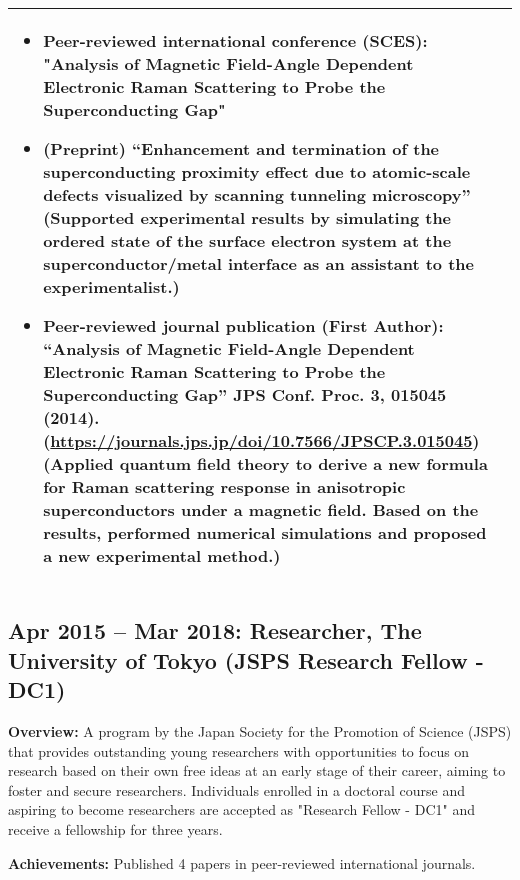 \documentclass[uplatex,a4j,10.5pt,dvipdfmx]{jsarticle}
\newcommand{\textbfsubsection}[1]{\subsection*{\textbf{#1}}}
\begin{document}
\begin{longtable}{|l|p{14cm}|}
\begin{itemize}[leftmargin=*]
		                                        \item Peer-reviewed international conference (SCES): "Analysis of Magnetic Field-Angle Dependent Electronic Raman Scattering to Probe the Superconducting Gap"
		                                        \item (Preprint) “Enhancement and termination of the superconducting proximity effect due to atomic-scale defects visualized by scanning tunneling microscopy” (Supported experimental results by simulating the ordered state of the surface electron system at the superconductor/metal interface as an assistant to the experimentalist.)
		                                        \item Peer-reviewed journal publication (First Author): “Analysis of Magnetic Field-Angle Dependent Electronic Raman Scattering to Probe the Superconducting Gap” JPS Conf. Proc. 3, 015045 (2014). (\url{https://journals.jps.jp/doi/10.7566/JPSCP.3.015045}) (Applied quantum field theory to derive a new formula for Raman scattering response in anisotropic superconductors under a magnetic field. Based on the results, performed numerical simulations and proposed a new experimental method.)
	                                        \end{itemize} \\
	\hline
\end{longtable}

\textbfsubsection{Apr 2015 -- Mar 2018: Researcher, The University of Tokyo (JSPS Research Fellow - DC1)}

\noindent\textbf{Overview:} A program by the Japan Society for the Promotion of Science (JSPS) that provides outstanding young researchers with opportunities to focus on research based on their own free ideas at an early stage of their career, aiming to foster and secure researchers. Individuals enrolled in a doctoral course and aspiring to become researchers are accepted as "Research Fellow - DC1" and receive a fellowship for three years.

\noindent\textbf{Achievements:} Published 4 papers in peer-reviewed international journals.

\newpage
\end{document}
